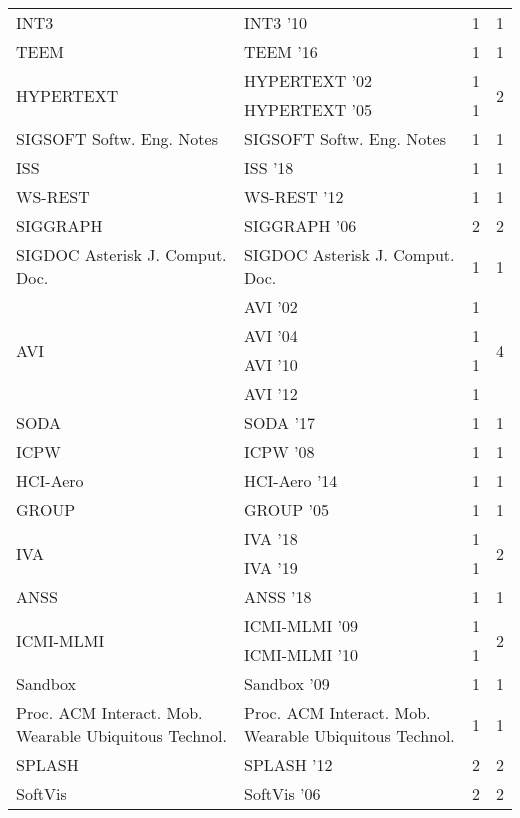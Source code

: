 \begin{table*}[t]
\begin{tabular}{llrr}
\multirow{1}{*}{INT3 } & INT3 '10 & 1 & \multirow{1}{*}{1}\\
\multirow{1}{*}{TEEM } & TEEM '16 & 1 & \multirow{1}{*}{1}\\
\multirow{2}{*}{HYPERTEXT } & HYPERTEXT '02 & 1 & \multirow{2}{*}{2}\\
& HYPERTEXT '05 & 1 &\\
\multirow{1}{*}{SIGSOFT Softw. Eng. Notes} & SIGSOFT Softw. Eng. Notes & 1 & \multirow{1}{*}{1}\\
\multirow{1}{*}{ISS } & ISS '18 & 1 & \multirow{1}{*}{1}\\
\multirow{1}{*}{WS-REST } & WS-REST '12 & 1 & \multirow{1}{*}{1}\\
\multirow{1}{*}{SIGGRAPH } & SIGGRAPH '06 & 2 & \multirow{1}{*}{2}\\
\multirow{1}{*}{SIGDOC Asterisk J. Comput. Doc.} & SIGDOC Asterisk J. Comput. Doc. & 1 & \multirow{1}{*}{1}\\
\multirow{4}{*}{AVI } & AVI '02 & 1 & \multirow{4}{*}{4}\\
& AVI '04 & 1 &\\
& AVI '10 & 1 &\\
& AVI '12 & 1 &\\
\multirow{1}{*}{SODA } & SODA '17 & 1 & \multirow{1}{*}{1}\\
\multirow{1}{*}{ICPW } & ICPW '08 & 1 & \multirow{1}{*}{1}\\
\multirow{1}{*}{HCI-Aero } & HCI-Aero '14 & 1 & \multirow{1}{*}{1}\\
\multirow{1}{*}{GROUP } & GROUP '05 & 1 & \multirow{1}{*}{1}\\
\multirow{2}{*}{IVA } & IVA '18 & 1 & \multirow{2}{*}{2}\\
& IVA '19 & 1 &\\
\multirow{1}{*}{ANSS } & ANSS '18 & 1 & \multirow{1}{*}{1}\\
\multirow{2}{*}{ICMI-MLMI } & ICMI-MLMI '09 & 1 & \multirow{2}{*}{2}\\
& ICMI-MLMI '10 & 1 &\\
\multirow{1}{*}{Sandbox } & Sandbox '09 & 1 & \multirow{1}{*}{1}\\
\multirow{1}{*}{Proc. ACM Interact. Mob. Wearable Ubiquitous Technol.} & Proc. ACM Interact. Mob. Wearable Ubiquitous Technol. & 1 & \multirow{1}{*}{1}\\
\multirow{1}{*}{SPLASH } & SPLASH '12 & 2 & \multirow{1}{*}{2}\\
\multirow{1}{*}{SoftVis } & SoftVis '06 & 2 & \multirow{1}{*}{2}\\

\end{tabular}
\end{table*}
